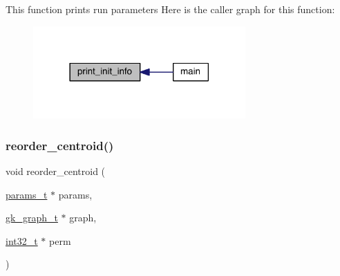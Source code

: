 This function prints run parameters Here is the caller graph for this function\+:\nopagebreak
\begin{figure}[H]
\begin{center}
\leavevmode
\includegraphics[width=230pt]{a00149_a4598b170c85571dc5cabc5cf4c0a960f_icgraph}
\end{center}
\end{figure}
\mbox{\label{a00149_a1a7121f82ee758732f18aedf847fe88a}} 
\subsubsection{\texorpdfstring{reorder\+\_\+centroid()}{reorder\_centroid()}}
{\footnotesize\ttfamily void reorder\+\_\+centroid (\begin{DoxyParamCaption}\item[{\hyperlink{a00706}{params\+\_\+t} $\ast$}]{params,  }\item[{\hyperlink{a00638}{gk\+\_\+graph\+\_\+t} $\ast$}]{graph,  }\item[{\hyperlink{a00119_a37994e3b11c72957c6f454c6ec96d43d}{int32\+\_\+t} $\ast$}]{perm }\end{DoxyParamCaption})}

